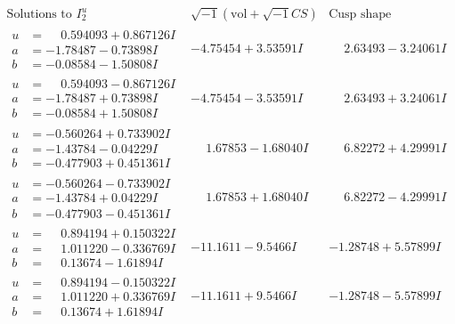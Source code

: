 \documentclass[1p]{elsarticle_modified}
\theoremstyle{definition}
\newcommand{\I}{\sqrt{-1}}
\begin{document}
$$\begin{array}{c|c|c}  
\text{Solutions to }I^u_{2}& \I (\text{vol} + \sqrt{-1}CS) & \text{Cusp shape}\\
 \hline 
\begin{aligned}
u &= \phantom{-}0.594093 + 0.867126 I \\
a &= -1.78487 - 0.73898 I \\
b &= -0.08584 - 1.50808 I\end{aligned}
 & -4.75454 + 3.53591 I & \phantom{-}2.63493 - 3.24061 I \\ \hline\begin{aligned}
u &= \phantom{-}0.594093 - 0.867126 I \\
a &= -1.78487 + 0.73898 I \\
b &= -0.08584 + 1.50808 I\end{aligned}
 & -4.75454 - 3.53591 I & \phantom{-}2.63493 + 3.24061 I \\ \hline\begin{aligned}
u &= -0.560264 + 0.733902 I \\
a &= -1.43784 - 0.04229 I \\
b &= -0.477903 + 0.451361 I\end{aligned}
 & \phantom{-}1.67853 - 1.68040 I & \phantom{-}6.82272 + 4.29991 I \\ \hline\begin{aligned}
u &= -0.560264 - 0.733902 I \\
a &= -1.43784 + 0.04229 I \\
b &= -0.477903 - 0.451361 I\end{aligned}
 & \phantom{-}1.67853 + 1.68040 I & \phantom{-}6.82272 - 4.29991 I \\ \hline\begin{aligned}
u &= \phantom{-}0.894194 + 0.150322 I \\
a &= \phantom{-}1.011220 - 0.336769 I \\
b &= \phantom{-}0.13674 - 1.61894 I\end{aligned}
 & -11.1611 - 9.5466 I & -1.28748 + 5.57899 I \\ \hline\begin{aligned}
u &= \phantom{-}0.894194 - 0.150322 I \\
a &= \phantom{-}1.011220 + 0.336769 I \\
b &= \phantom{-}0.13674 + 1.61894 I\end{aligned}
 & -11.1611 + 9.5466 I & -1.28748 - 5.57899 I \\ \hline\begin{aligned}

\end{aligned}
\end{array}$$
\end{document}
